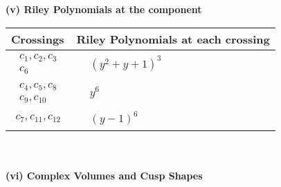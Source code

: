 \documentclass[1p]{elsarticle_modified}
\theoremstyle{definition}
\begin{document}
\newpage\renewcommand{\arraystretch}{1}
\flushleft \textbf{(v) Riley Polynomials at the component}\newline \\
\begin{tabular}{m{50pt}|m{274pt}}
Crossings & \hspace{64pt}Riley Polynomials at each crossing \\
\hline $$\begin{aligned}c_{1},c_{2},c_{3}\\c_{6}\end{aligned}$$&$\begin{aligned}
&(y^2+y+1)^3
\end{aligned}$\\
\hline $$\begin{aligned}c_{4},c_{5},c_{8}\\c_{9},c_{10}\end{aligned}$$&$\begin{aligned}
&y^6
\end{aligned}$\\
\hline $$\begin{aligned}c_{7},c_{11},c_{12}\end{aligned}$$&$\begin{aligned}
&(y-1)^6
\end{aligned}$\\
\hline
\end{tabular}\\~\\
\newpage\flushleft \textbf{(vi) Complex Volumes and Cusp Shapes}
\end{document}
